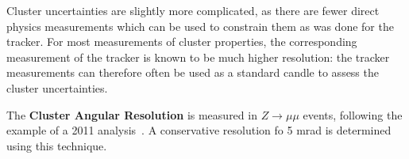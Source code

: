 	Cluster uncertainties are slightly more complicated, as there are fewer direct physics measurements which can be used to constrain them as was done for the tracker. For most measurements of cluster properties, the corresponding measurement of the tracker is known to be much higher resolution: the tracker measurements can therefore often be used as a standard candle to assess the cluster uncertainties.


	The \textbf{Cluster Angular Resolution} is measured in $Z\rightarrow \mu\mu$ events, following the example of a 2011 analysis~. A conservative resolution fo 5 mrad is determined using this technique.  %


